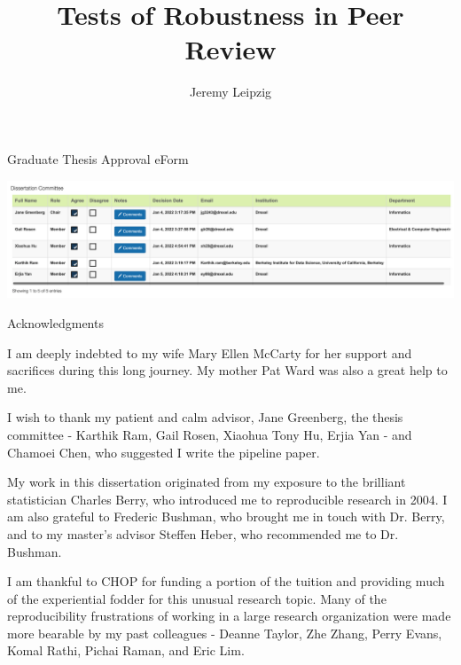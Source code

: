 \documentclass{drexelthesis}
\begin{document}
\graphicspath{{./pictures/}}

\doublespacing

\setlength\parindent{0pt}
\setlength{\parskip}{1em}
\renewcommand{\arraystretch}{1.3}

Graduate Thesis Approval eForm


\includegraphics[width=\textwidth]{./images/signatureform.png}

\title{Tests of Robustness in Peer Review}
\date{}
\author{Jeremy Leipzig}


\maketitle

\copyrightpage


{\Large Acknowledgments}

I am deeply indebted to my wife Mary Ellen McCarty for her support and sacrifices during this long journey. My mother Pat Ward was also a great help to me.

I wish to thank my patient and calm advisor, Jane Greenberg, the thesis committee - Karthik Ram, Gail Rosen, Xiaohua Tony Hu, Erjia Yan - and Chamoei Chen, who suggested I write the pipeline paper.

My work in this dissertation originated from my exposure to the brilliant statistician Charles Berry, who introduced me to reproducible research in 2004. I am also grateful to Frederic Bushman, who brought me in touch with Dr. Berry, and to my master's advisor Steffen Heber, who recommended me to Dr. Bushman.

I am thankful to CHOP for funding a portion of the tuition and providing much of the experiential fodder for this unusual research topic. Many of the reproducibility frustrations of working in a large research organization were made more bearable by my past colleagues - Deanne Taylor, Zhe Zhang, Perry Evans, Komal Rathi, Pichai Raman, and Eric Lim.
\end{document}
